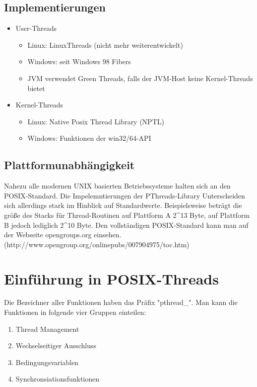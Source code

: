 \documentclass[11pt,a4paper]{article}
\begin{document}
\subsection{Implementierungen}
\begin{itemize}
	\item User-Threads
	\begin{itemize}
		\item Linux: LinuxThreads (nicht mehr weiterentwickelt)
		\item Windows: seit Windows 98 Fibers
		\item JVM verwendet Green Threads, falls der JVM-Host keine Kernel-Threads bietet
	\end{itemize}

	\item Kernel-Threads
	\begin{itemize}
		\item Linux: Native Posix Thread Library (NPTL)
		\item Windows: Funktionen der win32/64-API
	\end{itemize}
\end{itemize}

\subsection{Plattformunabhängigkeit}
Nahezu alle modernen UNIX basierten Betriebssysteme halten sich an den POSIX-Standard. Die Impelemntierungen der PThreads-Library Unterscheiden sich allerdings stark im Hinblick auf Standardwerte. Beispielsweise beträgt die größe des Stacks für Thread-Routinen auf Plattform A 2\^{}13 Byte, auf Plattform B jedoch lediglich 2\^{}10 Byte. Den vollständigen POSIX-Standard kann man auf der Webseite opengroups.org einsehen. \\
(http://www.opengroup.org/onlinepubs/007904975/toc.htm)

\section{Einführung in POSIX-Threads}

Die Bezeichner aller Funktionen haben das Präfix "pthread\_". Man kann die Funktionen in folgende vier Gruppen einteilen:

\begin{enumerate}
	\item Thread Management
	\item Wechselseitiger Ausschluss
	\item Bedingungsvariablen
	\item Synchronsiationsfunktionen
\end{enumerate}
\end{document}

